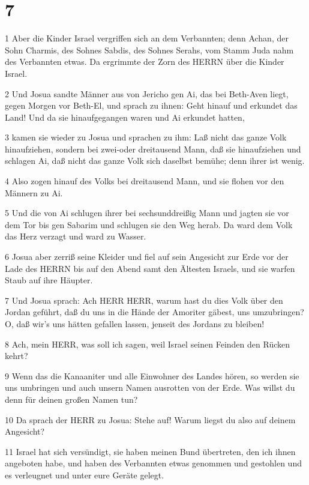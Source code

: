 \chapter{7}

\par 1 Aber die Kinder Israel vergriffen sich an dem Verbannten; denn Achan, der Sohn Charmis, des Sohnes Sabdis, des Sohnes Serahs, vom Stamm Juda nahm des Verbannten etwas. Da ergrimmte der Zorn des HERRN über die Kinder Israel.
\par 2 Und Josua sandte Männer aus von Jericho gen Ai, das bei Beth-Aven liegt, gegen Morgen vor Beth-El, und sprach zu ihnen: Geht hinauf und erkundet das Land! Und da sie hinaufgegangen waren und Ai erkundet hatten,
\par 3 kamen sie wieder zu Josua und sprachen zu ihm: Laß nicht das ganze Volk hinaufziehen, sondern bei zwei-oder dreitausend Mann, daß sie hinaufziehen und schlagen Ai, daß nicht das ganze Volk sich daselbst bemühe; denn ihrer ist wenig.
\par 4 Also zogen hinauf des Volks bei dreitausend Mann, und sie flohen vor den Männern zu Ai.
\par 5 Und die von Ai schlugen ihrer bei sechsunddreißig Mann und jagten sie vor dem Tor bis gen Sabarim und schlugen sie den Weg herab. Da ward dem Volk das Herz verzagt und ward zu Wasser.
\par 6 Josua aber zerriß seine Kleider und fiel auf sein Angesicht zur Erde vor der Lade des HERRN bis auf den Abend samt den Ältesten Israels, und sie warfen Staub auf ihre Häupter.
\par 7 Und Josua sprach: Ach HERR HERR, warum hast du dies Volk über den Jordan geführt, daß du uns in die Hände der Amoriter gäbest, uns umzubringen? O, daß wir's uns hätten gefallen lassen, jenseit des Jordans zu bleiben!
\par 8 Ach, mein HERR, was soll ich sagen, weil Israel seinen Feinden den Rücken kehrt?
\par 9 Wenn das die Kanaaniter und alle Einwohner des Landes hören, so werden sie uns umbringen und auch unsern Namen ausrotten von der Erde. Was willst du denn für deinen großen Namen tun?
\par 10 Da sprach der HERR zu Josua: Stehe auf! Warum liegst du also auf deinem Angesicht?
\par 11 Israel hat sich versündigt, sie haben meinen Bund übertreten, den ich ihnen angeboten habe, und haben des Verbannten etwas genommen und gestohlen und es verleugnet und unter eure Geräte gelegt.
